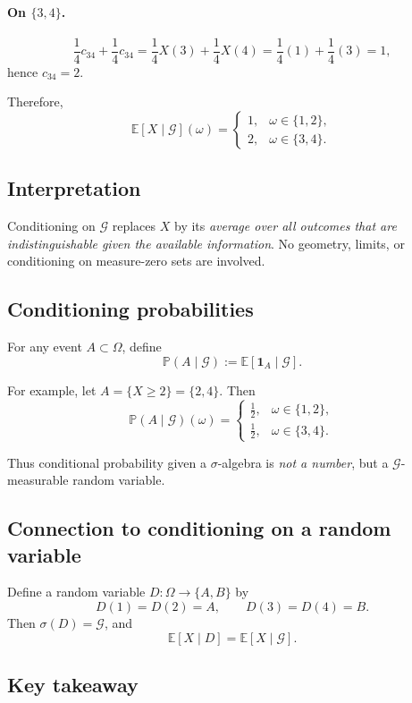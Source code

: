 \documentclass[11pt]{article}
\theoremstyle{remark}
\begin{document}
\paragraph{On $\{3,4\}$.}
\[
\frac14 c_{34} + \frac14 c_{34}
=
\frac14 X(3) + \frac14 X(4)
=
\frac14(1) + \frac14(3) = 1,
\]
hence $c_{34}=2$.

Therefore,
\[
\boxed{
\mathbb E[X\mid\mathcal G](\omega) =
\begin{cases}
1, & \omega\in\{1,2\},\\[4pt]
2, & \omega\in\{3,4\}.
\end{cases}}
\]

\subsection{Interpretation}

Conditioning on $\mathcal G$ replaces $X$ by its \emph{average over all outcomes
that are indistinguishable given the available information}.
No geometry, limits, or conditioning on measure-zero sets are involved.

\subsection{Conditioning probabilities}

For any event $A\subset\Omega$, define
\[
\mathbb P(A\mid\mathcal G) := \mathbb E[\mathbf 1_A\mid\mathcal G].
\]

For example, let $A=\{X\ge 2\}=\{2,4\}$. Then
\[
\mathbb P(A\mid\mathcal G)(\omega) =
\begin{cases}
\tfrac12, & \omega\in\{1,2\},\\[4pt]
\tfrac12, & \omega\in\{3,4\}.
\end{cases}
\]

Thus conditional probability given a $\sigma$-algebra is \emph{not a number},
but a $\mathcal G$-measurable random variable.

\subsection{Connection to conditioning on a random variable}

Define a random variable $D:\Omega\to\{A,B\}$ by
\[
D(1)=D(2)=A,\qquad
D(3)=D(4)=B.
\]
Then $\sigma(D)=\mathcal G$, and
\[
\mathbb E[X\mid D] = \mathbb E[X\mid\mathcal G].
\]

\subsection{Key takeaway}
\end{document}
